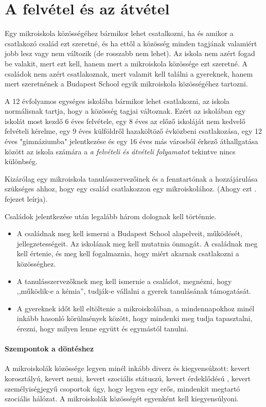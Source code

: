 \section{A felvétel és az
  átvétel}

Egy mikroiskola közösségéhez bármikor lehet csatalkozni, ha és amikor a
csatlakozó
család ezt szeretné, és ha ettől a közösség minden tagjának valamiért  jobb
lesz vagy nem változik (de rosszabb nem lehet).
Az iskola nem azért fogad be valakit, mert
ezt kell, hanem mert a mikroiskola közössége ezt szeretné.
A családok nem azért csatlakoznak, mert valamit kell találni a gyereknek, hanem
mert
szeretnének a Budapest School egyik mikroiskola közösségéhez tartozni.

A 12 évfolyamos egységes iskolába bármikor lehet csatlakozni, az iskola
normálisnak tartja, hogy a közösség tagjai változnak.
Ezért az iskolában egy iskolát most kezdő 6 éves felvétele, egy 8 éves az előző
iskoláját nem kedvelő felvételi kérelme, egy 9 éves
külföldről hazaköltöző évközbeni csatlakozása, egy 12 éves "gimnáziumba"
jelentkezése és egy 16 éves más városból érkező áthallgatása között az iskola
számára
a \emph{a felvételi és átvételi folyamatot} tekintve nincs különbség.

Kizárólag egy mikroiskola tanulásszervezőinek és a fenntartónak a hozzájárulása
szükséges ahhoz, hogy
egy család csatlakozzon egy mikroiskolához. (Ahogy ezt
. fejezet leírja).

Családok jelentkezése után legalább három dolognak kell történnie.
\begin{itemize}
      \item A családnak meg kell ismerni a Budapest School alapelveit,
            működését, jellegzetességeit. Az iskolának meg kell mutatnia
            önmagát. A
            családnak meg kell értenie,  és meg kell fogalmaznia, hogy miért
            akarnak
            csatlakozni a közösséghez.
      \item A tanulásszervezőknek meg kell ismernie a családot, megnézni, hogy
            ,,működik-e a kémia'', tudják-e vállalni a gyerek tanulásának
            támogatását.
      \item A gyereknek időt kell eltöltenie a mikroiskolában, a mindennapokhoz
            minél inkább hasonló körülmények között, hogy mindenki meg tudja
            tapasztalni,
            érezni, hogy milyen lenne együtt és egymástól tanulni.
\end{itemize}

\paragraph{Szempontok a döntéshez}
A mikroiskolák közössége legyen minél inkább diverz és kiegyensúlzott: kevert
korosztályú, kevert nemi, kevert szociális státuszú, kevert
érdeklődésú , kevert személyiségjegyű csoportok úgy, hogy legyen egy erős,
mindenkit megtartó szociális
hálózat. A mikroiskolák közösségét egyenként kell kiegyensúlyoni.

